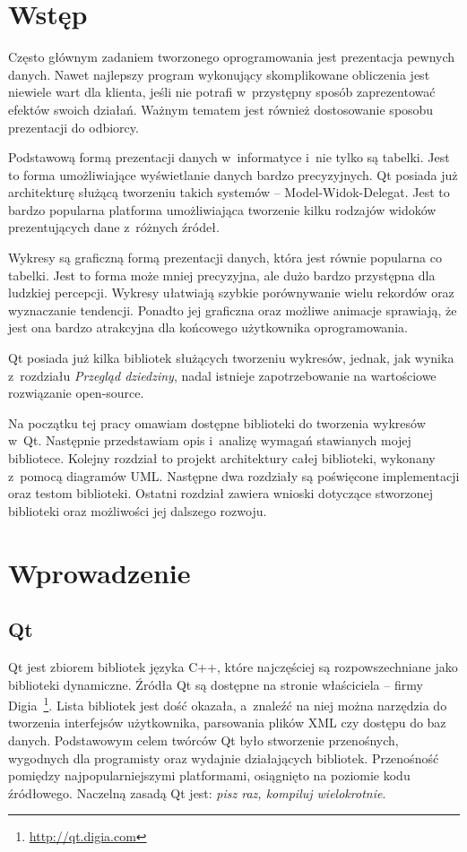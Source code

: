 \chapter*{Wstęp}
Często głównym zadaniem tworzonego oprogramowania jest prezentacja pewnych danych. Nawet najlepszy program wykonujący skomplikowane obliczenia jest niewiele wart dla klienta, jeśli nie potrafi w~przystępny sposób zaprezentować efektów swoich działań. Ważnym tematem jest również dostosowanie sposobu prezentacji do odbiorcy.
 
Podstawową formą prezentacji danych w~informatyce i~nie tylko są tabelki. Jest to forma umożliwiające wyświetlanie danych bardzo precyzyjnych. Qt posiada już architekturę służącą tworzeniu takich systemów -- Model-Widok-Delegat. Jest to bardzo popularna platforma umożliwiająca tworzenie kilku rodzajów widoków prezentujących dane z~różnych źródeł.

Wykresy są graficzną formą prezentacji danych, która jest równie popularna co tabelki. Jest to forma może mniej precyzyjna, ale dużo bardzo przystępna dla ludzkiej percepcji. Wykresy ułatwiają szybkie porównywanie wielu rekordów oraz wyznaczanie tendencji. Ponadto jej graficzna oraz możliwe animacje sprawiają, że jest ona bardzo atrakcyjna dla końcowego użytkownika oprogramowania.

Qt posiada już kilka bibliotek służących tworzeniu wykresów, jednak, jak wynika z~rozdziału \textit{Przegląd dziedziny}, nadal istnieje zapotrzebowanie na wartościowe rozwiązanie open-source.

Na początku tej pracy omawiam dostępne biblioteki do tworzenia wykresów w~Qt. Następnie przedstawiam opis i~analizę wymagań stawianych mojej bibliotece. Kolejny rozdział to projekt architektury całej biblioteki, wykonany z~pomocą diagramów UML. Następne dwa rozdziały są poświęcone implementacji oraz testom biblioteki. Ostatni rozdział zawiera wnioski dotyczące stworzonej biblioteki oraz możliwości jej dalszego rozwoju. 

\chapter{Wprowadzenie}
\section{Qt}
Qt jest zbiorem bibliotek języka C++, które najczęściej są rozpowszechniane jako biblioteki dynamiczne. Źródła Qt są dostępne na stronie właściciela -- firmy Digia~\footnote{\url{http://qt.digia.com}}. Lista bibliotek jest dość okazała, a~znaleźć na niej można narzędzia do tworzenia interfejsów użytkownika, parsowania plików XML czy dostępu do baz danych. Podstawowym celem twórców Qt było stworzenie przenośnych, wygodnych dla programisty oraz wydajnie działających bibliotek. Przenośność pomiędzy najpopularniejszymi platformami, osiągnięto na poziomie kodu źródłowego. Naczelną zasadą Qt jest: \textit{pisz raz, kompiluj wielokrotnie}. 


